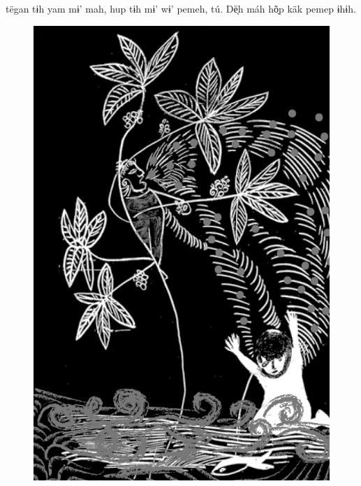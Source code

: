 \vspace{2em}

 tëgan tɨh yam mɨ’ mah,
hup tɨh mɨ’ wɨ’ pemeh, tú.
Dë̖h máh hõ̖p käk pemep ɨhɨh.

\vspace*{\fill}

\begin{figure}
\vspace*{-1.5cm}
\hspace*{-2.4cm}\includegraphics[width=142mm]{./imgs/img2.jpg}
\end{figure}

\chapter*{}

